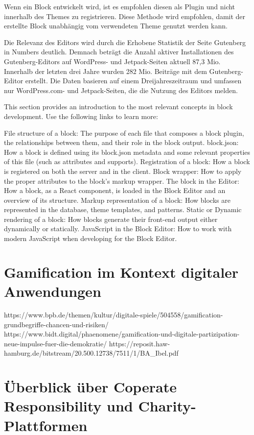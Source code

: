 Wenn ein Block entwickelt wird, ist es empfohlen diesen als Plugin und nicht innerhalb des Themes zu registrieren.
Diese Methode wird empfohlen, damit der erstellte Block unabhängig vom verwendeten Theme genutzt werden kann.




Die Relevanz des Editors wird durch die Erhobene Statistik der Seite Gutenberg in Numbers deutlich.
Demnach beträgt die Anzahl aktiver Installationen des Gutenberg-Editors auf WordPress- und Jetpack-Seiten aktuell 87,3 Mio.
Innerhalb der letzten drei Jahre wurden 282 Mio. Beiträge mit dem Gutenberg-Editor erstellt.
Die Daten basieren auf einem Dreijahreszeitraum und umfassen nur WordPress.com- und Jetpack-Seiten, die die Nutzung des Editors melden.

This section provides an introduction to the most relevant concepts in block development. Use the following links to learn more:

File structure of a block: The purpose of each file that composes a block plugin, the relationships between them, and their role in the block output.
block.json: How a block is defined using its block.json metadata and some relevant properties of this file (such as attributes and supports).
Registration of a block: How a block is registered on both the server and in the client.
Block wrapper: How to apply the proper attributes to the block’s markup wrapper.
The block in the Editor: How a block, as a React component, is loaded in the Block Editor and an overview of its structure.
Markup representation of a block: How blocks are represented in the database, theme templates, and patterns.
Static or Dynamic rendering of a block: How blocks generate their front-end output either dynamically or statically.
JavaScript in the Block Editor: How to work with modern JavaScript when developing for the Block Editor.


\section{Gamification im Kontext digitaler Anwendungen}
https://www.bpb.de/themen/kultur/digitale-spiele/504558/gamification-grundbegriffe-chancen-und-risiken/
https://www.bidt.digital/phaenomene/gamification-und-digitale-partizipation-neue-impulse-fuer-die-demokratie/
https://reposit.haw-hamburg.de/bitstream/20.500.12738/7511/1/BA_Ibel.pdf

\section{Überblick über Coperate Responsibility und Charity-Plattformen}


